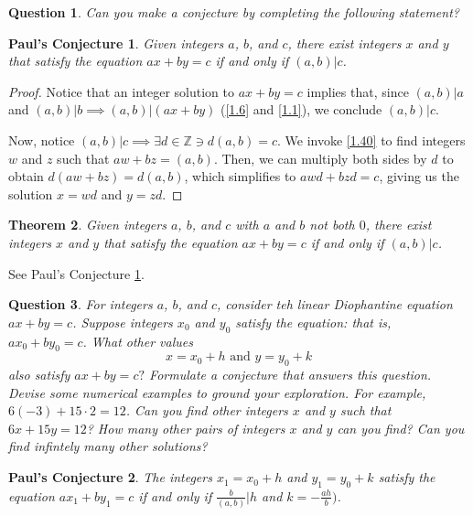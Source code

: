 \documentclass{article}
\newtheorem{thm}{Theorem}[section]
\newtheorem{ques}[thm]{Question}
\newtheorem{PC}{Paul's Conjecture}
\numberwithin{equation}{thm}
\begin{document}
\begin{ques} \label{1.47}
  Can you make a conjecture by completing the following statement?
\end{ques}

\begin{PC} \label{PC 1.47}
  Given integers $a$, $b$, and $c$, there exist integers $x$ and $y$ that satisfy the equation $ax + by = c$ if and only if $(a, b) | c$.
\end{PC}

\begin{proof}
  Notice that an integer solution to $ax + by = c$ implies that, since $(a, b) | a$ and $(a, b) | b \implies (a, b) | (ax + by)$ (\ref{1.6} and \ref{1.1}), we conclude $(a, b) | c$.

  Now, notice $(a, b) | c \implies \exists d \in \mathbb{Z} \ni d(a, b) = c$. We invoke \ref{1.40} to find integers $w$ and $z$ such that $aw + bz = (a, b)$. Then, we can multiply both sides by $d$ to obtain $d (aw + bz) = d (a,b)$, which simplifies to $awd + bzd = c$, giving us the solution $x = wd$ and $y = zd$.
\end{proof}



\begin{thm} \label{1.48}
  Given integers $a$, $b$, and $c$ with $a$ and $b$ not both $0$, there exist integers $x$ and $y$ that satisfy the equation $ax + by = c$ if and only if $(a, b) | c$.
\end{thm}

See Paul's Conjecture \ref{PC 1.47}.



\pagebreak



\begin{ques} \label{1.49}
  For integers $a$, $b$, and $c$, consider teh linear Diophantine equation $ax + by = c$. Suppose integers $x_0$ and $y_0$ satisfy the equation: that is, $ax_0 + by_0 = c$. What other values
  $$x = x_0 + h \mbox{ and } y = y_0 + k$$
  also satisfy $ax + by = c?$ Formulate a conjecture that answers this question. Devise some numerical examples to ground your exploration. For example, $6(-3) + 15 \cdot 2 = 12$. Can you find other integers $x$ and $y$ such that $6x + 15y = 12$? How many other pairs of integers $x$ and $y$ can you find? Can you find infintely many other solutions?
\end{ques}

\begin{PC} \label{PC 1.49}
  The integers $x_1 = x_0 + h$ and $y_1 = y_0 + k$ satisfy the equation $ax_1 + by_1 = c$ if and only if $\frac{b}{(a, b)} | h$ and $k = - \frac{ah}{b})$.
\end{PC}
\end{document}
